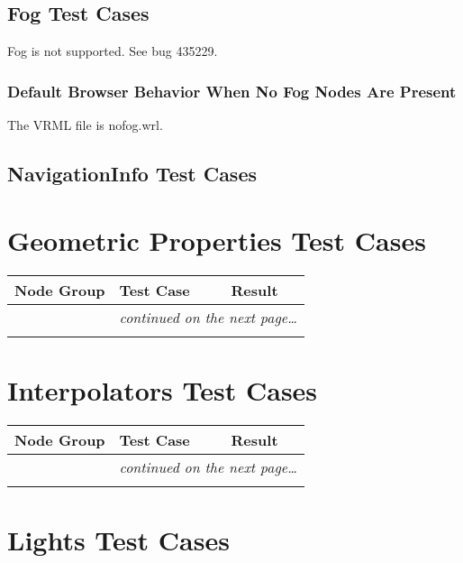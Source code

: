 \documentclass[12pt,letterpaper]{article}
\newcounter{testCaseCtr}
\newcommand{\resetTestCase}{\setcounter{testCaseCtr}{1}}
\newcommand{\FogA}{Default Browser Behavior When No Fog Nodes Are Present}
\begin{document}
\subsection{Fog Test Cases}
Fog is not supported. See bug 435229.

\subsubsection{\FogA}
The VRML file is nofog.wrl.

\subsection{NavigationInfo Test Cases}
\section{Geometric Properties Test Cases}
\resetTestCase

\begin{center}
\setlongtables
\begin{longtable}{|l|l|l|}
\hline
\textbf{Node Group} & \textbf{Test Case} & \textbf{Result} \\
\hline\hline
\endhead
 & \multicolumn{2}{|r|}{\textsl{continued on the next page\ldots}} \\
\hline
\endfoot
\hline
\endlastfoot
& & \\
\cline{2-3}
\end{longtable}
\end{center}

\section{Interpolators Test Cases}
\resetTestCase

\begin{center}
\setlongtables
\begin{longtable}{|l|l|l|}
\hline
\textbf{Node Group} & \textbf{Test Case} & \textbf{Result} \\
\hline\hline
\endhead
 & \multicolumn{2}{|r|}{\textsl{continued on the next page\ldots}} \\
\hline
\endfoot
\hline
\endlastfoot
& & \\
\cline{2-3}
\end{longtable}
\end{center}

\section{Lights Test Cases}
\resetTestCase
\end{document}
